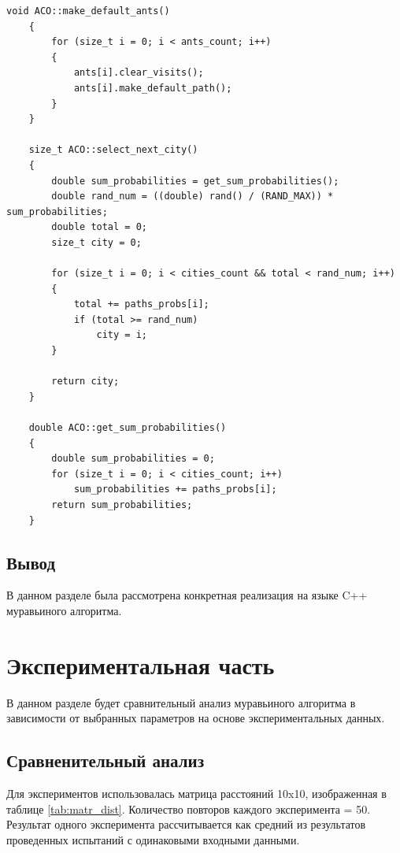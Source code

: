 \documentclass[12pt, a4paper]{report}
\begin{document}
\begin{lstlisting}[label=code:aсo_alg,caption=Основные функции муравьиного алгоритма]
    void ACO::make_default_ants()
    {
	    for (size_t i = 0; i < ants_count; i++)
	    {
	    	ants[i].clear_visits();
	    	ants[i].make_default_path();
	    }
    }
    
    size_t ACO::select_next_city()
    {
	    double sum_probabilities = get_sum_probabilities();
	    double rand_num = ((double) rand() / (RAND_MAX)) * sum_probabilities;
	    double total = 0;
	    size_t city = 0;
	    
	    for (size_t i = 0; i < cities_count && total < rand_num; i++)
	    {
	    	total += paths_probs[i];
	    	if (total >= rand_num)
	    		city = i;
	    }
	    
	    return city;
    }
    
    double ACO::get_sum_probabilities()
    {
	    double sum_probabilities = 0;
	    for (size_t i = 0; i < cities_count; i++)
	    	sum_probabilities += paths_probs[i];
	    return sum_probabilities;
    }
    \end{lstlisting}
    
    \section{Вывод}
    \hspace{0.5cm}В данном разделе была рассмотрена конкретная реализация на языке C++ муравьиного алгоритма.
    
    \chapter{Экспериментальная часть}
    \hspace{0.5cm}В данном разделе будет сравнительный анализ муравьиного алгоритма в зависимости от выбранных параметров на основе экспериментальных данных.
    \section {Сравненительный анализ}
    \hspace{0.5cm}Для экспериментов использовалась матрица расстояний 10x10, изображенная в таблице \ref{tab:matr_dist}. Количество повторов каждого эксперимента = 50. Результат одного эксперимента рассчитывается как средний из результатов проведенных испытаний с одинаковыми входными данными.
    
\end{document}
